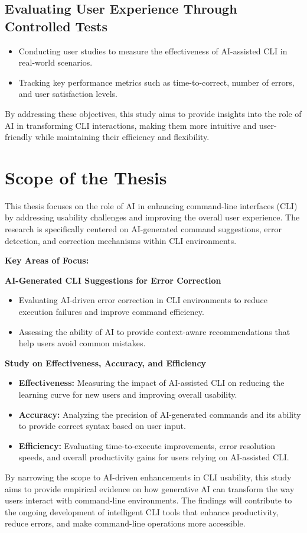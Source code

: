 \subsection{Evaluating User Experience Through Controlled Tests}
\begin{itemize}
	\item Conducting user studies to measure the effectiveness of AI-assisted CLI in real-world scenarios.
	\item Tracking key performance metrics such as time-to-correct, number of errors, and user satisfaction levels.
\end{itemize}

By addressing these objectives, this study aims to provide insights into the role of AI in transforming CLI interactions, making them more intuitive and user-friendly while maintaining their efficiency and flexibility.

\section{Scope of the Thesis}

This thesis focuses on the role of AI in enhancing command-line interfaces (CLI) by addressing usability challenges and improving the overall user experience. The research is specifically centered on AI-generated command suggestions, error detection, and correction mechanisms within CLI environments.

\textbf{Key Areas of Focus:}

\textbf{AI-Generated CLI Suggestions for Error Correction}
\begin{itemize}
	\item Evaluating AI-driven error correction in CLI environments to reduce execution failures and improve command efficiency.
	\item Assessing the ability of AI to provide context-aware recommendations that help users avoid common mistakes.
\end{itemize}

\textbf{Study on Effectiveness, Accuracy, and Efficiency}
\begin{itemize}
	\item \textbf{Effectiveness:} Measuring the impact of AI-assisted CLI on reducing the learning curve for new users and improving overall usability.
	\item \textbf{Accuracy:} Analyzing the precision of AI-generated commands and its ability to provide correct syntax based on user input.
	\item \textbf{Efficiency:} Evaluating time-to-execute improvements, error resolution speeds, and overall productivity gains for users relying on AI-assisted CLI.
\end{itemize}

By narrowing the scope to AI-driven enhancements in CLI usability, this study aims to provide empirical evidence on how generative AI can transform the way users interact with command-line environments. The findings will contribute to the ongoing development of intelligent CLI tools that enhance productivity, reduce errors, and make command-line operations more accessible.


